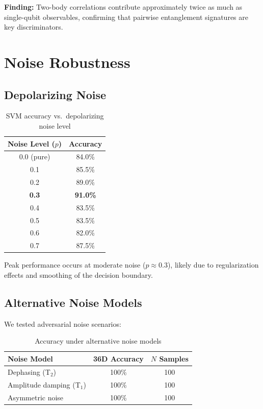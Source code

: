 \documentclass[11pt,a4paper]{article}
\begin{document}
\textbf{Finding:} Two-body correlations contribute approximately twice as much as single-qubit observables, confirming that pairwise entanglement signatures are key discriminators.

\section{Noise Robustness}

\subsection{Depolarizing Noise}

\begin{table}[h]
\centering
\caption{SVM accuracy vs.\ depolarizing noise level}
\begin{tabular}{cc}
\toprule
\textbf{Noise Level ($p$)} & \textbf{Accuracy} \\
\midrule
0.0 (pure) & 84.0\% \\
0.1 & 85.5\% \\
0.2 & 89.0\% \\
\textbf{0.3} & \textbf{91.0\%} \\
0.4 & 83.5\% \\
0.5 & 83.5\% \\
0.6 & 82.0\% \\
0.7 & 87.5\% \\
\bottomrule
\end{tabular}
\end{table}

Peak performance occurs at moderate noise ($p \approx 0.3$), likely due to regularization effects and smoothing of the decision boundary.

\subsection{Alternative Noise Models}

We tested adversarial noise scenarios:

\begin{table}[h]
\centering
\caption{Accuracy under alternative noise models}
\begin{tabular}{lcc}
\toprule
\textbf{Noise Model} & \textbf{36D Accuracy} & \textbf{$N$ Samples} \\
\midrule
Dephasing (T$_2$) & 100\% & 100 \\
Amplitude damping (T$_1$) & 100\% & 100 \\
Asymmetric noise & 100\% & 100 \\
\bottomrule
\end{tabular}
\end{table}
\end{document}
